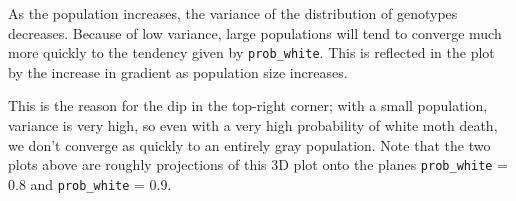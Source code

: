 \documentclass[leqno]{article}
\begin{document}
As the population increases, the variance of the distribution of genotypes decreases. Because of low variance, large populations will tend to converge much more quickly to the tendency given by {\tt prob\_white}. This is reflected in the plot by the increase in gradient as population size increases.

This is the reason for the dip in the top-right corner; with a small population, variance is very high, so even with a very high probability of white moth death, we don't converge as quickly to an entirely gray population. Note that the two plots above are roughly projections of this 3D plot onto the planes {\tt prob\_white} = 0.8 and {\tt prob\_white} = 0.9. 
\end{document}
